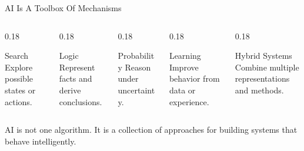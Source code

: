 \documentclass[aspectratio=169]{beamer}
\begin{document}
\begin{frame}[shrink=5]{AI Is A Toolbox Of Mechanisms}
  \begin{columns}[T,onlytextwidth]
    \begin{column}{0.18\textwidth}
      \begin{block}{Search}
        Explore possible states or actions.
      \end{block}
    \end{column}
    \begin{column}{0.18\textwidth}
      \begin{block}{Logic}
        Represent facts and derive conclusions.
      \end{block}
    \end{column}
    \begin{column}{0.18\textwidth}
      \begin{block}{Probability}
        Reason under uncertainty.
      \end{block}
    \end{column}
    \begin{column}{0.18\textwidth}
      \begin{block}{Learning}
        Improve behavior from data or experience.
      \end{block}
    \end{column}
    \begin{column}{0.18\textwidth}
      \begin{block}{Hybrid Systems}
        Combine multiple representations and methods.
      \end{block}
    \end{column}
  \end{columns}
  \vspace{0.16in}
  \begin{keyidea}
    AI is not one algorithm. It is a collection of approaches for building systems that behave intelligently.
  \end{keyidea}
\end{frame}

\end{document}
